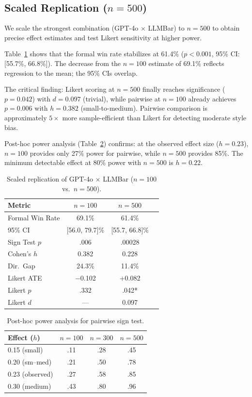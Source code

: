 \documentclass[11pt,a4paper]{article}
\begin{document}
\subsection{Scaled Replication ($n{=}500$)}
\label{sec:scaled}

We scale the strongest combination (GPT-4o $\times$ LLMBar) to $n{=}500$ to obtain precise effect estimates and test Likert sensitivity at higher power.

Table~\ref{tab:scaled} shows that the formal win rate stabilizes at 61.4\% ($p{<}0.001$, 95\% CI: [55.7\%, 66.8\%]).
The decrease from the $n{=}100$ estimate of 69.1\% reflects regression to the mean; the 95\% CIs overlap.

The critical finding: Likert scoring at $n{=}500$ finally reaches significance ($p{=}0.042$) with $d{=}0.097$ (trivial), while pairwise at $n{=}100$ already achieves $p{=}0.006$ with $h{=}0.382$ (small-to-medium).
Pairwise comparison is approximately $5{\times}$ more sample-efficient than Likert for detecting moderate style bias.

Post-hoc power analysis (Table~\ref{tab:power}) confirms: at the observed effect size ($h{=}0.23$), $n{=}100$ provides only 27\% power for pairwise, while $n{=}500$ provides 85\%.
The minimum detectable effect at 80\% power with $n{=}500$ is $h{=}0.22$.

\begin{table}[t]
\centering
\small
\begin{tabular}{lccc}
\toprule
\textbf{Metric} & $n{=}100$ & $n{=}500$ \\
\midrule
Formal Win Rate & 69.1\% & 61.4\% \\
95\% CI & [56.0, 79.7]\% & [55.7, 66.8]\% \\
Sign Test $p$ & .006 & .00028 \\
Cohen's $h$ & 0.382 & 0.228 \\
Dir.\ Gap & 24.3\% & 11.4\% \\
Likert ATE & $-$0.102 & $+$0.082 \\
Likert $p$ & .332 & .042* \\
Likert $d$ & --- & 0.097 \\
\bottomrule
\end{tabular}
\caption{Scaled replication of GPT-4o $\times$ LLMBar ($n{=}100$ vs.\ $n{=}500$).}
\label{tab:scaled}
\end{table}

\begin{table}[t]
\centering
\small
\begin{tabular}{lccc}
\toprule
\textbf{Effect ($h$)} & $n{=}100$ & $n{=}300$ & $n{=}500$ \\
\midrule
0.15 (small) & .11 & .28 & .45 \\
0.20 (sm--med) & .21 & .50 & .78 \\
0.23 (observed) & .27 & .58 & .85 \\
0.30 (medium) & .43 & .80 & .96 \\
\bottomrule
\end{tabular}
\caption{Post-hoc power analysis for pairwise sign test.}
\label{tab:power}
\end{table}
\end{document}
